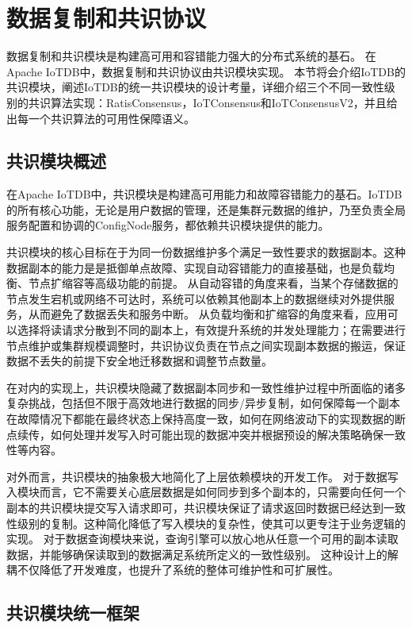 
\chapter{数据复制和共识协议}

数据复制和共识模块是构建高可用和容错能力强大的分布式系统的基石。
在Apache IoTDB中，数据复制和共识协议由共识模块实现。
本节将会介绍IoTDB的共识模块，阐述IoTDB的统一共识模块的设计考量，详细介绍三个不同一致性级别的共识算法实现：RatisConsensus，IoTConsensus和IoTConsensusV2，并且给出每一个共识算法的可用性保障语义。


\section{共识模块概述}

在Apache IoTDB中，共识模块是构建高可用能力和故障容错能力的基石。IoTDB的所有核心功能，无论是用户数据的管理，还是集群元数据的维护，乃至负责全局服务配置和协调的ConfigNode服务，都依赖共识模块提供的能力。

共识模块的核心目标在于为同一份数据维护多个满足一致性要求的数据副本。这种数据副本的能力是是抵御单点故障、实现自动容错能力的直接基础，也是负载均衡、节点扩缩容等高级功能的前提。
从自动容错的角度来看，当某个存储数据的节点发生宕机或网络不可达时，系统可以依赖其他副本上的数据继续对外提供服务，从而避免了数据丢失和服务中断。
从负载均衡和扩缩容的角度来看，应用可以选择将读请求分散到不同的副本上，有效提升系统的并发处理能力；在需要进行节点维护或集群规模调整时，共识协议负责在节点之间实现副本数据的搬运，保证数据不丢失的前提下安全地迁移数据和调整节点数量。

在对内的实现上，共识模块隐藏了数据副本同步和一致性维护过程中所面临的诸多复杂挑战，包括但不限于高效地进行数据的同步/异步复制，如何保障每一个副本在故障情况下都能在最终状态上保持高度一致，如何在网络波动下的实现数据的断点续传，如何处理并发写入时可能出现的数据冲突并根据预设的解决策略确保一致性等内容。

对外而言，共识模块的抽象极大地简化了上层依赖模块的开发工作。
对于数据写入模块而言，它不需要关心底层数据是如何同步到多个副本的，只需要向任何一个副本的共识模块提交写入请求即可，共识模块保证了请求返回时数据已经达到一致性级别的复制。这种简化降低了写入模块的复杂性，使其可以更专注于业务逻辑的实现。
对于数据查询模块来说，查询引擎可以放心地从任意一个可用的副本读取数据，并能够确保读取到的数据满足系统所定义的一致性级别。
这种设计上的解耦不仅降低了开发难度，也提升了系统的整体可维护性和可扩展性。


\section{共识模块统一框架}


